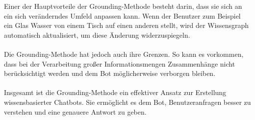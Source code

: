 Einer der Hauptvorteile der Grounding-Methode besteht darin, dass sie sich an ein sich veränderndes Umfeld anpassen kann. 
Wenn der Benutzer zum Beispiel ein Glas Wasser von einem Tisch auf einen anderen stellt, wird der Wissensgraph automatisch aktualisiert, um diese Änderung widerzuspiegeln.\\\\
Die Grounding-Methode hat jedoch auch ihre Grenzen. 
So kann es vorkommen, dass bei der Verarbeitung großer Informationsmengen Zusammenhänge nicht berücksichtigt werden und dem Bot möglicherweise verborgen bleiben.\\\\
Insgesamt ist die Grounding-Methode ein effektiver Ansatz zur Erstellung wissensbasierter Chatbots. 
Sie ermöglicht es dem Bot, Benutzeranfragen besser zu verstehen und eine genauere Antwort zu geben.

